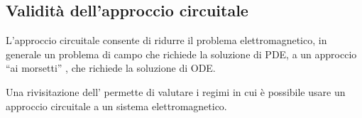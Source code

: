 \documentclass[letterpaper,10pt,english]{jupyterBook}
\begin{document}
\subsection{Validità dell’approccio circuitale}
\label{\detokenize{ch/circuits-electric-approximation:validita-dell-approccio-circuitale}}\label{\detokenize{ch/circuits-electric-approximation:classical-electromagnetism-circuits-electric-approximation}}\label{\detokenize{ch/circuits-electric-approximation::doc}}
\sphinxAtStartPar
L’approccio circuitale consente di ridurre il problema elettromagnetico, in generale un problema di campo che richiede la soluzione di PDE, a un approccio “ai morsetti” , che richiede la soluzione di ODE.

\sphinxAtStartPar
Una rivisitazione dell’{\hyperref[\detokenize{ch/energy:classical-electromagnetism-energy}]{}} permette di valutare i regimi in cui è possibile usare un approccio circuitale a un sistema elettromagnetico.
\end{document}
